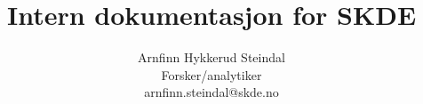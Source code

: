 \usepackage{xcolor}
\usepackage[norsk]{babel}

\usepackage[utf8]{inputenc}
\usepackage{libertine} %
\usepackage[T1]{fontenc}

\usepackage{parskip}

\usepackage{booktabs}


\usepackage{sectsty}
\allsectionsfont{\sffamily\color{skde}}

\usepackage{pdfpages} %




\makeatletter
\newcommand{\globalcolor}[1]{%
  \color{#1}\global\let\default@color\current@color
}
\makeatother

\AtBeginDocument{\globalcolor{text}}

\usepackage{framed,color}

\renewcommand{\textfraction}{0.05}
\renewcommand{\topfraction}{0.8}
\renewcommand{\bottomfraction}{0.8}
\renewcommand{\floatpagefraction}{0.75}

\title{Intern dokumentasjon for SKDE} %
\newcommand{\sammendrag}{Dette notatet er en samling dokumentasjon om diverse datatekniske utfordringer og løsninger ved SKDE. Hovedsakelig skrevet av Arnfinn, men andre må også gjerne bidra.} %
\newcommand{\notatnummer}{\today} %
\author{%
    Arnfinn Hykkerud Steindal \\
    Forsker/analytiker \\
    arnfinn.steindal@skde.no
}

\newcommand{\hoydestrek}{65pt} %

\usepackage{amsmath}
\usepackage{tikz}
\usepackage{epigraph}

\renewcommand\epigraphflush{flushright}
\renewcommand\epigraphsize{\normalsize}
\setlength{}


